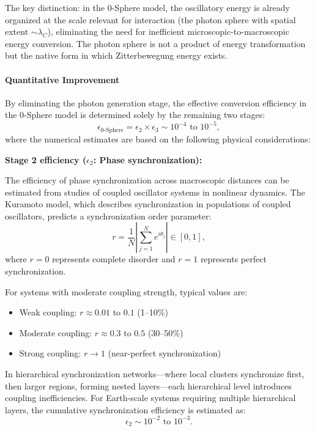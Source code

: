 \documentclass[12pt,letterpaper]{article}
\begin{document}
The key distinction: in the 0-Sphere model, the oscillatory energy is already organized at the scale relevant for interaction (the photon sphere with spatial extent $\sim \lambda_C$), eliminating the need for inefficient microscopic-to-macroscopic energy conversion. The photon sphere is not a product of energy transformation but the native form in which Zitterbewegung energy exists.

\paragraph{Quantitative Improvement}

By eliminating the photon generation stage, the effective conversion efficiency in the 0-Sphere model is determined solely by the remaining two stages:
\begin{equation}
\epsilon_{\text{0-Sphere}} = \epsilon_2 \times \epsilon_3 \sim 10^{-4} \text{ to } 10^{-5},
\end{equation}
where the numerical estimates are based on the following physical considerations:

\textbf{Stage 2 efficiency ($\epsilon_2$: Phase synchronization):}

The efficiency of phase synchronization across macroscopic distances can be estimated from studies of coupled oscillator systems in nonlinear dynamics. The Kuramoto model, which describes synchronization in populations of coupled oscillators, predicts a synchronization order parameter:
\begin{equation}
r = \frac{1}{N}\left|\sum_{j=1}^N e^{i\theta_j}\right| \in [0,1],
\end{equation}
where $r = 0$ represents complete disorder and $r = 1$ represents perfect synchronization.

For systems with moderate coupling strength, typical values are:
\begin{itemize}
\item Weak coupling: $r \approx 0.01$ to $0.1$ (1--10\%)
\item Moderate coupling: $r \approx 0.3$ to $0.5$ (30--50\%)
\item Strong coupling: $r \to 1$ (near-perfect synchronization)
\end{itemize}

In hierarchical synchronization networks—where local clusters synchronize first, then larger regions, forming nested layers—each hierarchical level introduces coupling inefficiencies. For Earth-scale systems requiring multiple hierarchical layers, the cumulative synchronization efficiency is estimated as:
\begin{equation}
\epsilon_2 \sim 10^{-2} \text{ to } 10^{-3}.
\end{equation}
\end{document}
